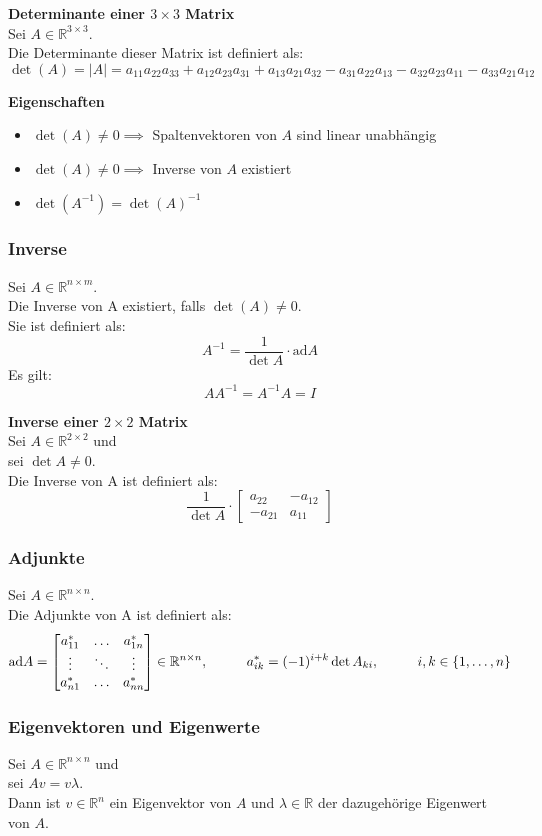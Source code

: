 \documentclass[10pt,a4paper]{article}
\newcommand{\tab}[1][1]{\hspace*{#1cm}}
\newcommand{\vect}[1]{\ensuremath{\begin{bmatrix}#1\end{bmatrix}}}
\begin{document}
\textbf{Determinante einer $3 \times 3$ Matrix} \\
Sei $A \in \mathbb{R}^{3 \times 3}$. \\
Die Determinante dieser Matrix ist definiert als:
$$
	\det(A) = |A| = a_{11}a_{22}a_{33} + a_{12}a_{23}a_{31} + a_{13}a_{21}a_{32} - a_{31}a_{22}a_{13} - a_{32}a_{23}a_{11} - a_{33}a_{21}a_{12}
$$

\textbf{Eigenschaften}
\begin{itemize}
	\item $\det(A) ≠ 0 \implies$ Spaltenvektoren von $A$ sind linear unabhängig
	\item $\det(A) ≠ 0 \implies$ Inverse von $A$ existiert
	\item $\det(A^{-1}) = \det(A)^{-1}$
\end{itemize}

\subsubsection{Inverse}
Sei $A \in \mathbb{R}^{n \times m}$. \\
Die Inverse von A existiert, falls $\det(A) ≠ 0$. \\
Sie ist definiert als:
$$
	A^{-1} = \frac{1}{\det A} ⋅ \textrm{ad}A
$$
Es gilt:
$$
	AA^{-1} = A^{-1}A = I
$$

\textbf{Inverse einer $2 \times 2$ Matrix} \\
Sei $A \in \mathbb{R}^{2 \times 2}$ und \\
sei $\det A ≠ 0$. \\
Die Inverse von A ist definiert als:
$$
	\frac{1}{\det A} ⋅ \vect{a_{22} & -a_{12} \\ -a_{21} & a_{11}}
$$

\subsubsection{Adjunkte}
Sei $A \in \mathbb{R}^{n \times n}$. \\
Die Adjunkte von A ist definiert als:
$$
	\textrm{ad} A  = \begin{bmatrix}
	a^*_{11} & \dots & a^*_{1n} \\
	\vdots & \ddots & \vdots \\
	a^*_{n1} & \dots & a^*_{nn}
	\end{bmatrix} \in \mathbb{R}^{n \times n}, \tab a^*_{ik} = (-1)^{i + k} \det A_{ki}, \tab i,k \in \{1, \dots, n\}
$$

\subsubsection{Eigenvektoren und Eigenwerte}
Sei $A \in \mathbb{R}^{n \times n}$ und \\
sei $Av = v\lambda$. \\
Dann ist $v \in \mathbb{R}^n$ ein Eigenvektor von $A$ und $\lambda \in \mathbb{R}$ der dazugehörige Eigenwert von $A$. \\
\end{document}
